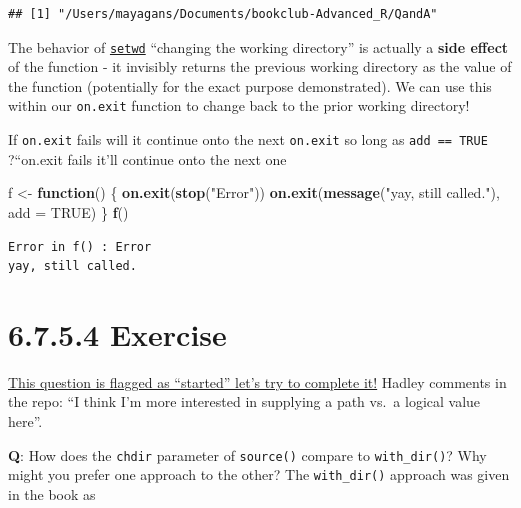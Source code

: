\documentclass[]{book}
\newenvironment{Shaded}{\begin{snugshade}}{\end{snugshade}}
\newcommand{\ControlFlowTok}[1]{\textcolor[rgb]{0.13,0.29,0.53}{\textbf{#1}}}
\newcommand{\DataTypeTok}[1]{\textcolor[rgb]{0.13,0.29,0.53}{#1}}
\newcommand{\KeywordTok}[1]{\textcolor[rgb]{0.13,0.29,0.53}{\textbf{#1}}}
\newcommand{\NormalTok}[1]{#1}
\newcommand{\OtherTok}[1]{\textcolor[rgb]{0.56,0.35,0.01}{#1}}
\newcommand{\StringTok}[1]{\textcolor[rgb]{0.31,0.60,0.02}{#1}}
\begin{document}
\begin{verbatim}
## [1] "/Users/mayagans/Documents/bookclub-Advanced_R/QandA"
\end{verbatim}

The behavior of \href{https://www.rdocumentation.org/packages/base/versions/3.6.2/topics/getwd}{\texttt{setwd}} ``changing the working directory'' is actually a \textbf{side effect} of the function - it invisibly returns the previous working directory as the value of the function (potentially for the exact purpose demonstrated). We can use this within our \texttt{on.exit} function to change back to the prior working directory!

If \texttt{on.exit} fails will it continue onto the next \texttt{on.exit} so long as \texttt{add\ ==\ TRUE}
?``on.exit fails it'll continue onto the next one

\begin{Shaded}
\begin{Highlighting}[]
\NormalTok{f <-}\StringTok{ }\ControlFlowTok{function}\NormalTok{() \{}
  \KeywordTok{on.exit}\NormalTok{(}\KeywordTok{stop}\NormalTok{(}\StringTok{"Error"}\NormalTok{))}
  \KeywordTok{on.exit}\NormalTok{(}\KeywordTok{message}\NormalTok{(}\StringTok{"yay, still called."}\NormalTok{), }\DataTypeTok{add =} \OtherTok{TRUE}\NormalTok{)}
\NormalTok{\}}
\KeywordTok{f}\NormalTok{()}
\end{Highlighting}
\end{Shaded}

\begin{verbatim}
Error in f() : Error
yay, still called.
\end{verbatim}

\hypertarget{exercise-5}{%
\section*{6.7.5.4 Exercise}\label{exercise-5}}

\href{https://github.com/Tazinho/Advanced-R-Solutions/blob/5043d9b06c7469a010c568ecb85e12bedca75207/2-06-Functions.Rmd\#L350}{This question is flagged as ``started'' let's try to complete it!} Hadley comments in the repo: ``I think I'm more interested in supplying a path vs.~a logical value here''.

\textbf{{Q}}: How does the \texttt{chdir} parameter of \texttt{source()} compare to \texttt{with\_dir()}? Why might you prefer one approach to the other?
The \texttt{with\_dir()} approach was given in the book as
\end{document}
